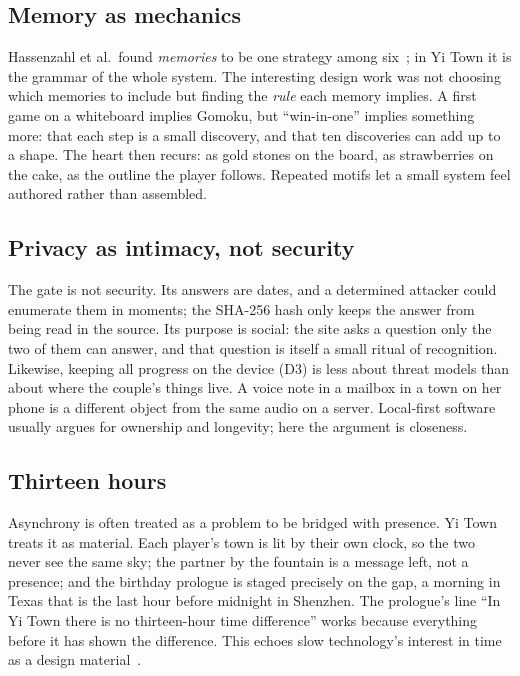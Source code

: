 \documentclass[sigconf,nonacm]{acmart}
\newcommand{\yt}{Yi Town}
\newcommand{\dc}[1]{\textsc{D#1}}
\begin{document}
\subsection{Memory as mechanics}
Hassenzahl et al.\ found \emph{memories} to be one strategy among six~\cite{hassenzahl2012love}; in
\yt{} it is the grammar of the whole system. The interesting design work was not choosing which
memories to include but finding the \emph{rule} each memory implies. A first game on a whiteboard
implies Gomoku, but ``win-in-one'' implies something more: that each step is a small discovery, and
that ten discoveries can add up to a shape. The heart then recurs: as gold stones on the board, as
strawberries on the cake, as the outline the player follows. Repeated motifs let a small system feel
authored rather than assembled.

\subsection{Privacy as intimacy, not security}\label{sec:privacy}
The gate is not security. Its answers are dates, and a determined attacker could enumerate them in
moments; the SHA-256 hash only keeps the answer from being read in the source. Its purpose is
social: the site asks a question only the two of them can answer, and that question is itself a
small ritual of recognition. Likewise, keeping all progress on the device (\dc{3}) is less about
threat models than about where the couple's things live. A voice note in a mailbox in a town on her
phone is a different object from the same audio on a server. Local-first software~\cite{kleppmann2019localfirst}
usually argues for ownership and longevity; here the argument is closeness.

\subsection{Thirteen hours}
Asynchrony is often treated as a problem to be bridged with presence. \yt{} treats it as material.
Each player's town is lit by their own clock, so the two never see the same sky; the partner by the
fountain is a message left, not a presence; and the birthday prologue is staged precisely on the
gap, a morning in Texas that is the last hour before midnight in Shenzhen. The prologue's line ``In
Yi Town there is no thirteen-hour time difference'' works because everything before it has shown the
difference. This echoes slow technology's interest in time as a design
material~\cite{hallnas2001slow,odom2012technology}.
\end{document}

